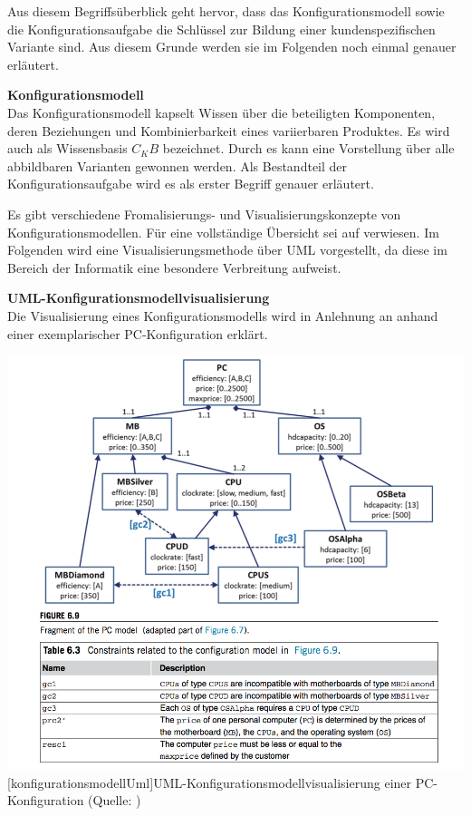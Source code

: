 \documentclass[12pt,a4paper,bibliography=totocnumbered,listof=totoc]{scrartcl}
\begin{document}
Aus diesem Begriffsüberblick geht hervor, dass das Konfigurationsmodell sowie die Konfigurationsaufgabe die Schlüssel zur Bildung einer kundenspezifischen Variante sind. Aus diesem Grunde werden sie im Folgenden noch einmal genauer erläutert.


\textbf{Konfigurationsmodell}\\
Das Konfigurationsmodell kapselt Wissen über die beteiligten Komponenten, deren Beziehungen und Kombinierbarkeit eines variierbaren Produktes. Es wird auch als Wissensbasis $C_KB$ bezeichnet. Durch es kann eine Vorstellung über alle abbildbaren Varianten gewonnen werden. Als Bestandteil der Konfigurationsaufgabe wird es als erster Begriff genauer erläutert.

Es gibt verschiedene Fromalisierungs- und Visualisierungskonzepte von Konfigurationsmodellen. Für eine vollständige Übersicht sei auf \citet{felferning14} verwiesen. Im Folgenden wird eine Visualisierungsmethode über UML vorgestellt, da diese im Bereich der Informatik eine besondere Verbreitung aufweist.


\textbf{UML-Konfigurationsmodellvisualisierung}\\
Die Visualisierung eines Konfigurationsmodells wird in Anlehnung an \citeauthor{felferning14} anhand einer exemplarischer PC-Konfiguration erklärt.

\vspace{1em}
\begin{minipage}{\linewidth}
	\centering
	\includegraphics[width=0.9\linewidth]{Abbildungen/konfigurationsmodellUml.png}
	[konfigurationsmodellUml]{UML-Konfigurationsmodellvisualisierung einer PC-Konfiguration (Quelle: \cite{felferning14})}
	\label{fig:konfigurationsmodellUml}
\end{minipage}
\vspace{1em}
\end{document}
